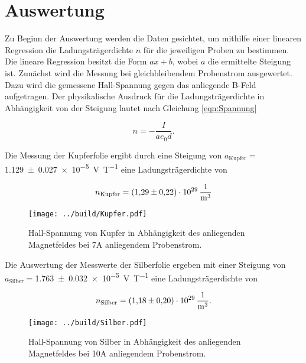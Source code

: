 


\section{Auswertung}
\label{sec:Auswertung}

\noindent Zu Beginn der Auswertung werden die Daten gesichtet, um mithilfe einer linearen Regression 
die Ladungsträgerdichte $n$ für die jeweiligen Proben zu bestimmen. Die lineare Regression besitzt die Form $ax+b$, wobei $a$ 
die ermittelte Steigung ist. 
Zunächst wird die Messung bei gleichbleibendem Probenstrom ausgewertet. 
Dazu wird die gemessene Hall-Spannung gegen das anliegende B-Feld aufgetragen. 
Der physikalische Ausdruck für die Ladungsträgerdichte in Abhängigkeit von der Steigung lautet nach 
Gleichung \eqref{eqn:Spannung} 

\begin{equation*}
    n = - \frac{I}{a e_0 d}.
\end{equation*}

\noindent Die Messung der Kupferfolie ergibt durch eine Steigung von $a_\text{Kupfer}=$\qty{1.129\pm 0.027e-5}{\volt\per\tesla} eine 
Ladungsträgerdichte von 

\begin{equation*}
    n_\text{Kupfer} = \qty{1.29\pm0.22e29}{\per\cubic\meter}
\end{equation*}

\begin{figure}[H]
    \centering
    \label{Kupfer}
    \texttt{[image: ../build/Kupfer.pdf]}
    \caption{Hall-Spannung von Kupfer in Abhängigkeit des anliegenden Magnetfeldes bei 7A anliegendem Probenstrom.}
\end{figure}

\noindent Die Auswertung der Messwerte der Silberfolie ergeben mit einer Steigung von $a_\text{Silber}=$\qty{1.763\pm 0.032e-5}{\volt\per\tesla} eine 
Ladungsträgerdichte von 

\begin{equation*}
    n_\text{Silber} = \qty{1.18\pm0.2e29}{\per\cubic\meter}.
\end{equation*}

\begin{figure}[H]
    \centering
    \label{Silber}
    \texttt{[image: ../build/Silber.pdf]}
    \caption{Hall-Spannung von Silber in Abhängigkeit des anliegenden Magnetfeldes bei 10A anliegendem Probenstrom.}
\end{figure}

